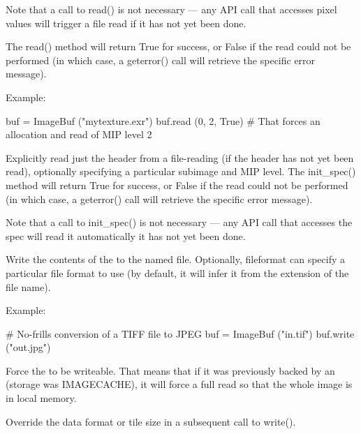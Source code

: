 Note that a call to {\cf read()} is not necessary --- any \ImageBuf API call
that accesses pixel values will trigger a file read if it has not yet been
done.

The {\cf read()} method will return {\cf True} for success, or {\cf False}
if the read could not be performed (in which case, a {\cf geterror()} call
will retrieve the specific error message).

\noindent Example:
\begin{code}
    buf = ImageBuf ("mytexture.exr")
    buf.read (0, 2, True)
    # That forces an allocation and read of MIP level 2
\end{code}
\apiend


Explicitly read just the header from a file-reading \ImageBuf (if the header
has not yet been read), optionally specifying a particular subimage and MIP
level. The {\cf init_spec()} method will return {\cf True} for success, or
{\cf False} if the read could not be performed (in which case, a {\cf
geterror()} call will retrieve the specific error message).

Note that a call to {\cf init_spec()} is not necessary --- any \ImageBuf API
call that accesses the spec will read it automatically it has not yet been
done.
\apiend

Write the contents of the \ImageBuf to the named file.  Optionally, {\cf
fileformat} can specify a particular file format to use (by default, it
will infer it from the extension of the file name).

\noindent Example:
\begin{code}
    # No-frills conversion of a TIFF file to JPEG
    buf = ImageBuf ("in.tif")
    buf.write ("out.jpg")
\end{code}
\apiend

Force the \ImageBuf to be writeable. That means that if it was previously
backed by an \ImageCache (storage was {\cf IMAGECACHE}), it will force a
full read so that the whole image is in local memory.
\apiend


Override the data format or tile size in a subsequent call to {\cf write()}.

